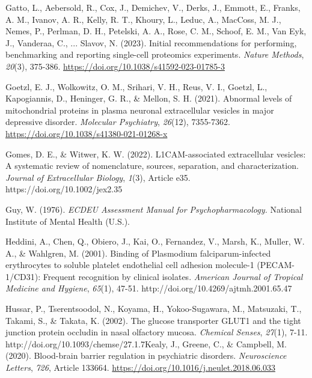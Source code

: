 \documentclass[authordate, empirical]{jote-new-article}
\begin{document}
	Gatto, L., Aebersold, R., Cox, J., Demichev, V., Derks, J., Emmott, E., Franks, A. M., Ivanov, A. R., Kelly, R. T., Khoury, L., Leduc, A., MacCoss, M. J., Nemes, P., Perlman, D. H., Petelski, A. A., Rose, C. M., Schoof, E. M., Van Eyk, J., Vanderaa, C., ... Slavov, N. (2023). Initial recommendations for performing, benchmarking and reporting single-cell proteomics experiments. \emph{Nature Methods},\emph{ 20}(3), 375-386. \href{https://doi.org/10.1038/s41592-023-01785-3}{https://doi.org/10.1038/s41592-023-01785-3}



	Goetzl, E. J., Wolkowitz, O. M., Srihari, V. H., Reus, V. I., Goetzl, L., Kapogiannis, D., Heninger, G. R., \& Mellon, S. H. (2021). Abnormal levels of mitochondrial proteins in plasma neuronal extracellular vesicles in major depressive disorder. \emph{Molecular Psychiatry},\emph{ 26}(12), 7355-7362. \href{https://doi.org/10.1038/s41380-021-01268-x}{https://doi.org/10.1038/s41380-021-01268-x}



	Gomes, D. E., \& Witwer, K. W. (2022). L1CAM-associated extracellular vesicles: A systematic review of nomenclature, sources, separation, and characterization. \emph{Journal of Extracellular Biology},\emph{ 1}(3), Article e35. https://doi.org/10.1002/jex2.35



	Guy, W. (1976). \emph{ECDEU Assessment Manual for Psychopharmacology. }National Institute of Mental Health (U.S.).



	Heddini, A., Chen, Q., Obiero, J., Kai, O., Fernandez, V., Marsh, K., Muller, W. A., \& Wahlgren, M. (2001). Binding of Plasmodium falciparum-infected erythrocytes to soluble platelet endothelial cell adhesion molecule-1 (PECAM-1/CD31): Frequent recognition by clinical isolates. \emph{American Journal of Tropical Medicine and Hygiene},\emph{ 65}(1), 47-51. http://doi.org/10.4269/ajtmh.2001.65.47



	Hussar, P., Tserentsoodol, N., Koyama, H., Yokoo-Sugawara, M., Matsuzaki, T., Takami, S., \& Takata, K. (2002). The glucose transporter GLUT1 and the tight junction protein occludin in nasal olfactory mucosa. \emph{Chemical Senses},\emph{ 27}(1), 7-11. http://doi.org/10.1093/chemse/27.1.7Kealy, J., Greene, C., \& Campbell, M. (2020). Blood-brain barrier regulation in psychiatric disorders. \emph{Neuroscience Letters},\emph{ 726}, Article 133664. \href{https://doi.org/10.1016/j.neulet.2018.06.033}{https://doi.org/10.1016/j.neulet.2018.06.033}
\end{document}
